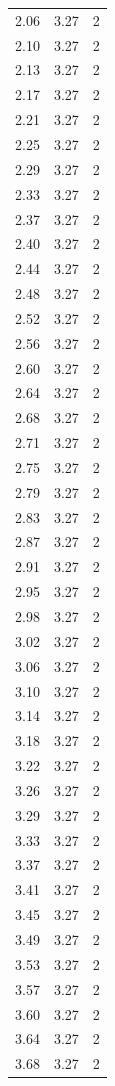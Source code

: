 \begin{longtable}{lrr}
  2.06 & 3.27 & 2 \\
  2.10 & 3.27 & 2 \\
  2.13 & 3.27 & 2 \\
  2.17 & 3.27 & 2 \\
  2.21 & 3.27 & 2 \\
  2.25 & 3.27 & 2 \\
  2.29 & 3.27 & 2 \\
  2.33 & 3.27 & 2 \\
  2.37 & 3.27 & 2 \\
  2.40 & 3.27 & 2 \\
  2.44 & 3.27 & 2 \\
  2.48 & 3.27 & 2 \\
  2.52 & 3.27 & 2 \\
  2.56 & 3.27 & 2 \\
  2.60 & 3.27 & 2 \\
  2.64 & 3.27 & 2 \\
  2.68 & 3.27 & 2 \\
  2.71 & 3.27 & 2 \\
  2.75 & 3.27 & 2 \\
  2.79 & 3.27 & 2 \\
  2.83 & 3.27 & 2 \\
  2.87 & 3.27 & 2 \\
  2.91 & 3.27 & 2 \\
  2.95 & 3.27 & 2 \\
  2.98 & 3.27 & 2 \\
  3.02 & 3.27 & 2 \\
  3.06 & 3.27 & 2 \\
  3.10 & 3.27 & 2 \\
  3.14 & 3.27 & 2 \\
  3.18 & 3.27 & 2 \\
  3.22 & 3.27 & 2 \\
  3.26 & 3.27 & 2 \\
  3.29 & 3.27 & 2 \\
  3.33 & 3.27 & 2 \\
  3.37 & 3.27 & 2 \\
  3.41 & 3.27 & 2 \\
  3.45 & 3.27 & 2 \\
  3.49 & 3.27 & 2 \\
  3.53 & 3.27 & 2 \\
  3.57 & 3.27 & 2 \\
  3.60 & 3.27 & 2 \\
  3.64 & 3.27 & 2 \\
  3.68 & 3.27 & 2 \\

\end{longtable}
